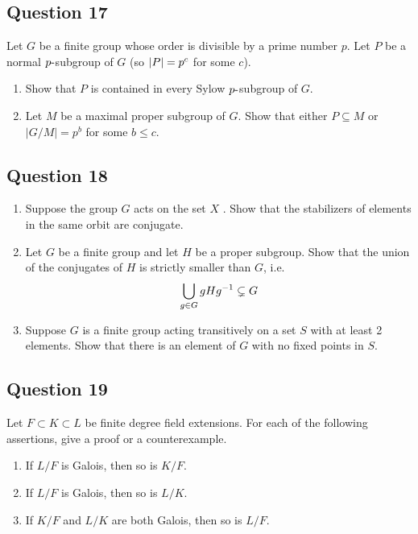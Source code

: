 \documentclass[12pt]{article}
\begin{document}
\hypertarget{question-17}{%
\subsection{Question 17}\label{question-17}}

Let \(G\) be a finite group whose order is divisible by a prime number
\(p\). Let \(P\) be a normal \(p{\hbox{-}}\)subgroup of \(G\) (so
\({\left\lvert {P} \right\rvert} = p^c\) for some \(c\)).

\begin{enumerate}
\def\labelenumi{(\alph{enumi})}
\item
  Show that \(P\) is contained in every Sylow \(p{\hbox{-}}\)subgroup of
  \(G\).
\item
  Let \(M\) be a maximal proper subgroup of \(G\). Show that either
  \(P \subseteq M\) or \(|G/M | = p^b\) for some \(b \leq c\).
\end{enumerate}

\hypertarget{question-18}{%
\subsection{Question 18}\label{question-18}}

\begin{enumerate}
\def\labelenumi{(\alph{enumi})}
\item
  Suppose the group \(G\) acts on the set \(X\) . Show that the
  stabilizers of elements in the same orbit are conjugate.
\item
  Let \(G\) be a finite group and let \(H\) be a proper subgroup. Show
  that the union of the conjugates of \(H\) is strictly smaller than
  \(G\), i.e. \[
  \bigcup_{g\in G} gHg^{-1} \subsetneq G
  \]
\item
  Suppose \(G\) is a finite group acting transitively on a set \(S\)
  with at least 2 elements. Show that there is an element of \(G\) with
  no fixed points in \(S\).
\end{enumerate}

\hypertarget{question-19}{%
\subsection{Question 19}\label{question-19}}

Let \(F \subset K \subset L\) be finite degree field extensions. For
each of the following assertions, give a proof or a counterexample.

\begin{enumerate}
\def\labelenumi{(\alph{enumi})}
\item
  If \(L/F\) is Galois, then so is \(K/F\).
\item
  If \(L/F\) is Galois, then so is \(L/K\).
\item
  If \(K/F\) and \(L/K\) are both Galois, then so is \(L/F\).
\end{enumerate}
\end{document}
